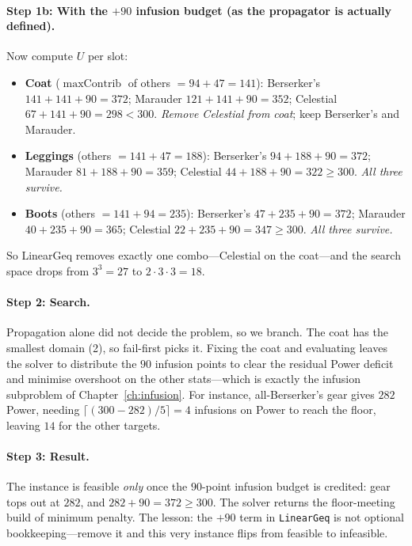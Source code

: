 \documentclass[11pt, a4paper, oneside]{book}
\newcommand{\maxContrib}{\operatorname{maxContrib}}
\begin{document}
\paragraph{Step 1b: With the $+90$ infusion budget (as the propagator is
actually defined).}
Now compute $U$ per slot:
\begin{itemize}[nosep]
  \item \textbf{Coat} ($\maxContrib$ of others $= 94 + 47 = 141$):
    Berserker's $141+141+90 = 372$; Marauder $121+141+90 = 352$;
    Celestial $67+141+90 = 298 < 300$.  \emph{Remove Celestial from coat}; keep
    Berserker's and Marauder.
  \item \textbf{Leggings} (others $= 141 + 47 = 188$): Berserker's
    $94+188+90 = 372$; Marauder $81+188+90=359$; Celestial
    $44+188+90 = 322 \geq 300$.  \emph{All three survive.}
  \item \textbf{Boots} (others $= 141 + 94 = 235$): Berserker's
    $47+235+90=372$; Marauder $40+235+90=365$; Celestial
    $22+235+90 = 347 \geq 300$.  \emph{All three survive.}
\end{itemize}
So LinearGeq removes exactly one combo---Celestial on the coat---and the search
space drops from $3^3 = 27$ to $2 \cdot 3 \cdot 3 = 18$.

\paragraph{Step 2: Search.}
Propagation alone did not decide the problem, so we branch.  The coat has the
smallest domain (2), so fail-first picks it.  Fixing the coat and evaluating
leaves the solver to distribute the $90$ infusion points to clear the residual
Power deficit and minimise overshoot on the other stats---which is exactly the
infusion subproblem of Chapter~\ref{ch:infusion}.  For instance,
all-Berserker's gear gives $282$ Power, needing $\lceil (300-282)/5\rceil = 4$
infusions on Power to reach the floor, leaving $14$ for the other targets.

\paragraph{Step 3: Result.}
The instance is feasible \emph{only} once the $90$-point infusion budget is
credited: gear tops out at $282$, and $282 + 90 = 372 \geq 300$.  The solver
returns the floor-meeting build of minimum penalty.  The lesson: the $+90$ term
in \texttt{LinearGeq} is not optional bookkeeping---remove it and this very
instance flips from feasible to infeasible.
\end{document}
